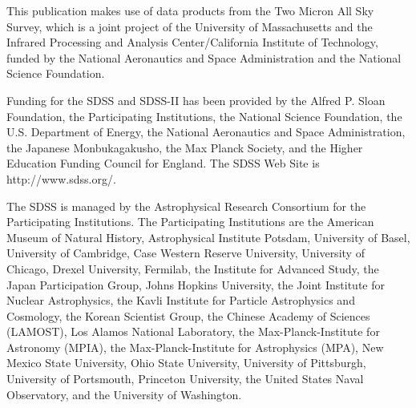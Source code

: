 \documentclass[preprint2]{aastex}
\begin{document}
This publication makes use of data products from the Two Micron All Sky Survey, which is a joint project of the University of Massachusetts and the Infrared Processing and Analysis Center/California Institute of Technology, funded by the National Aeronautics and Space Administration and the National Science Foundation.

Funding for the SDSS and SDSS-II has been provided by the Alfred P. Sloan Foundation, the Participating Institutions, the National Science Foundation, the U.S. Department of Energy, the National Aeronautics and Space Administration, the Japanese Monbukagakusho, the Max Planck Society, and the Higher Education Funding Council for England. The SDSS Web Site is http://www.sdss.org/.

The SDSS is managed by the Astrophysical Research Consortium for the Participating Institutions. The Participating Institutions are the American Museum of Natural History, Astrophysical Institute Potsdam, University of Basel, University of Cambridge, Case Western Reserve University, University of Chicago, Drexel University, Fermilab, the Institute for Advanced Study, the Japan Participation Group, Johns Hopkins University, the Joint Institute for Nuclear Astrophysics, the Kavli Institute for Particle Astrophysics and Cosmology, the Korean Scientist Group, the Chinese Academy of Sciences (LAMOST), Los Alamos National Laboratory, the Max-Planck-Institute for Astronomy (MPIA), the Max-Planck-Institute for Astrophysics (MPA), New Mexico State University, Ohio State University, University of Pittsburgh, University of Portsmouth, Princeton University, the United States Naval Observatory, and the University of Washington.


	
\end{document}
